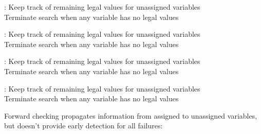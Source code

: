 \documentclass{article}
\begin{document}
\begin{huge}
: Keep track of remaining legal values for unassigned variables\\
Terminate search when any variable has no legal values

\vspace*{0.1in}

\maxfigwidth
{}



: Keep track of remaining legal values for unassigned variables\\
Terminate search when any variable has no legal values

\vspace*{0.1in}

\maxfigwidth
{}



: Keep track of remaining legal values for unassigned variables\\
Terminate search when any variable has no legal values

\vspace*{0.1in}

\maxfigwidth
{}



: Keep track of remaining legal values for unassigned variables\\
Terminate search when any variable has no legal values

\vspace*{0.1in}

\maxfigwidth
{}


Forward checking propagates information from assigned to unassigned variables,
but doesn't provide early detection for all failures:

\vspace*{0.1in}


\end{huge}
\end{document}
